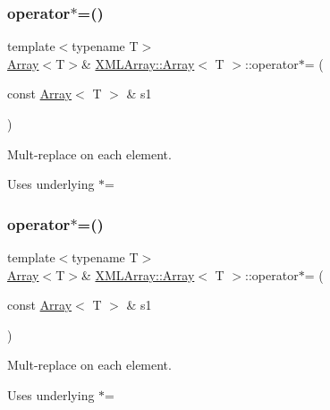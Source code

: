 \subsubsection{\texorpdfstring{operator$\ast$=()}{operator*=()}\hspace{0.1cm}{\footnotesize\ttfamily [2/6]}}
{\footnotesize\ttfamily template$<$typename T$>$ \\
\mbox{\hyperlink{classXMLArray_1_1Array}{Array}}$<$T$>$\& \mbox{\hyperlink{classXMLArray_1_1Array}{X\+M\+L\+Array\+::\+Array}}$<$ T $>$\+::operator$\ast$= (\begin{DoxyParamCaption}\item[{const \mbox{\hyperlink{classXMLArray_1_1Array}{Array}}$<$ T $>$ \&}]{s1 }\end{DoxyParamCaption})\hspace{0.3cm}{\ttfamily [inline]}}



Mult-\/replace on each element. 

Uses underlying $\ast$= \mbox{\label{classXMLArray_1_1Array_a866bd17aae2f3d1935f015a936ce9424}} 
\subsubsection{\texorpdfstring{operator$\ast$=()}{operator*=()}\hspace{0.1cm}{\footnotesize\ttfamily [3/6]}}
{\footnotesize\ttfamily template$<$typename T$>$ \\
\mbox{\hyperlink{classXMLArray_1_1Array}{Array}}$<$T$>$\& \mbox{\hyperlink{classXMLArray_1_1Array}{X\+M\+L\+Array\+::\+Array}}$<$ T $>$\+::operator$\ast$= (\begin{DoxyParamCaption}\item[{const \mbox{\hyperlink{classXMLArray_1_1Array}{Array}}$<$ T $>$ \&}]{s1 }\end{DoxyParamCaption})\hspace{0.3cm}{\ttfamily [inline]}}



Mult-\/replace on each element. 

Uses underlying $\ast$= \mbox{\label{classXMLArray_1_1Array_a4afa4c469f84b40f88c27273602528cc}} 
